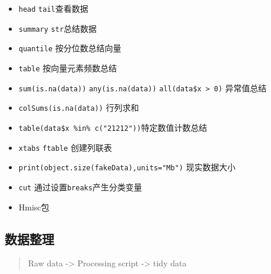 \documentclass[]{book}
\newenvironment{Shaded}{\begin{snugshade}}{\end{snugshade}}
\newcommand{\CommentTok}[1]{\textcolor[rgb]{0.56,0.35,0.01}{\textit{#1}}}
\newcommand{\DataTypeTok}[1]{\textcolor[rgb]{0.13,0.29,0.53}{#1}}
\newcommand{\DecValTok}[1]{\textcolor[rgb]{0.00,0.00,0.81}{#1}}
\newcommand{\KeywordTok}[1]{\textcolor[rgb]{0.13,0.29,0.53}{\textbf{#1}}}
\newcommand{\NormalTok}[1]{#1}
\newcommand{\OperatorTok}[1]{\textcolor[rgb]{0.81,0.36,0.00}{\textbf{#1}}}
\newcommand{\StringTok}[1]{\textcolor[rgb]{0.31,0.60,0.02}{#1}}
\providecommand{\tightlist}{%
  \setlength{\itemsep}{0pt}\setlength{\parskip}{0pt}}
\begin{document}
\begin{itemize}
\tightlist
\item
  \texttt{head} \texttt{tail}查看数据
\item
  \texttt{summary} \texttt{str}总结数据
\item
  \texttt{quantile} 按分位数总结向量
\item
  \texttt{table} 按向量元素频数总结
\item
  \texttt{sum(is.na(data))} \texttt{any(is.na(data))} \texttt{all(data\$x\ \textgreater{}\ 0)} 异常值总结
\item
  \texttt{colSums(is.na(data))} 行列求和
\item
  \texttt{table(data\$x\ \%in\%\ c("21212"))}特定数值计数总结
\item
  \texttt{xtabs} \texttt{ftable} 创建列联表
\item
  \texttt{print(object.size(fakeData),units="Mb")} 现实数据大小
\item
  \texttt{cut} 通过设置\texttt{breaks}产生分类变量
\item
  Hmisc包
\end{itemize}

\begin{Shaded}
\end{Shaded}

\hypertarget{ux6570ux636eux6574ux7406}{%
\subsection{数据整理}\label{ux6570ux636eux6574ux7406}}

\begin{quote}
Raw data -\textgreater{} Processing script -\textgreater{} tidy data
\end{quote}
\end{document}
